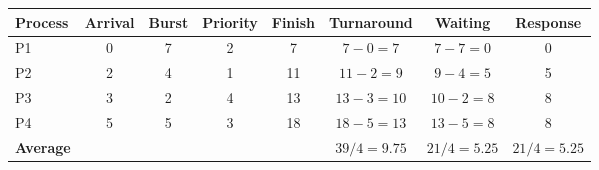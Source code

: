 \begin{tabular}{@{}lccccccc@{}}
\toprule
\textbf{Process} & \textbf{Arrival} & \textbf{Burst} & \textbf{Priority} & \textbf{Finish} & \textbf{Turnaround} & \textbf{Waiting} & \textbf{Response}\\
\midrule
P1 & 0 & 7 & 2 & 7 & $7-0=7$ & $7-7=0$ & 0\\
P2 & 2 & 4 & 1 & 11 & $11-2=9$ & $9-4=5$ & 5\\
P3 & 3 & 2 & 4 & 13 & $13-3=10$ & $10-2=8$ & 8\\
P4 & 5 & 5 & 3 & 18 & $18-5=13$ & $13-5=8$ & 8\\
\midrule
\textbf{Average} &  &  &  &  & $39/4=9.75$ & $21/4=5.25$ & $21/4=5.25$\\
\bottomrule
\end{tabular}
